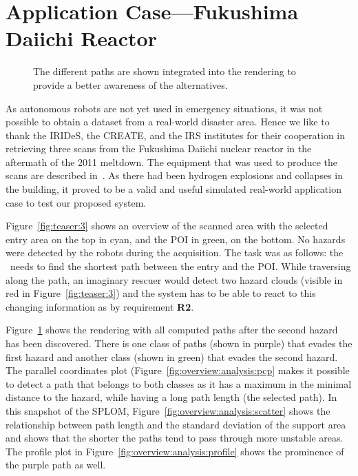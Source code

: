 \section{Application Case---Fukushima Daiichi Reactor} \label{sec:cases}
\begin{figure}
    \centering
    \caption{The different paths are shown integrated into the rendering to provide a better awareness of the alternatives.}
    \label{fig:overview:analysis:paths}
\end{figure}
As autonomous robots are not yet used in emergency situations, it was not possible to obtain a dataset from a real-world disaster area. Hence we like to thank the IRIDeS, the CREATE, and the IRS institutes for their cooperation in retrieving three scans from the Fukushima Daiichi nuclear reactor in the aftermath of the 2011 meltdown. The equipment that was used to produce the scans are described in~\cite{journals/jfr/NagataniKOOYTNYKFK13}. As there had been hydrogen explosions and collapses in the building, it proved to be a valid and useful simulated real-world application case to test our proposed system.

Figure~\ref{fig:teaser:3} shows an overview of the scanned area with the selected entry area on the top in cyan, and the POI in green, on the bottom. No hazards were detected by the robots during the acquisition. The task was as follows: the \IC\ needs to find the shortest path between the entry and the POI. While traversing along the path, an imaginary rescuer would detect two hazard clouds (visible in red in Figure~\ref{fig:teaser:3}) and the system has to be able to react to this changing information as by requirement {\bfseries R2}.

Figure~\ref{fig:overview:analysis:paths} shows the rendering with all computed paths after the second hazard has been discovered. There is one class of paths (shown in purple) that evades the first hazard and another class (shown in green) that evades the second hazard. The parallel coordinates plot (Figure~\ref{fig:overview:analysis:pcp} makes it possible to detect a path that belongs to both classes as it has a maximum in the minimal distance to the hazard, while having a long path length (the selected path). In this snapshot of the SPLOM, Figure~\ref{fig:overview:analysis:scatter} shows the relationship between path length and the standard deviation of the support area and shows that the shorter the paths tend to pass through more unstable areas. The profile plot in Figure~\ref{fig:overview:analysis:profile} shows the prominence of the purple path as well.
